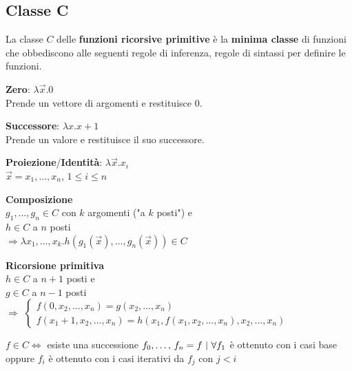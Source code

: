 \documentclass[10pt]{book}
\begin{document}
\subsection{Classe C}
La classe $C$ delle \textbf{funzioni ricorsive primitive} è la \textbf{minima classe} di funzioni che obbediscono alle seguenti regole di inferenza, regole di sintassi per definire le funzioni.\\
\begin{list}{}{\textbf{Casi base}}
	\item \textbf{Zero}: $\lambda \overrightarrow{x}.0$\\
	Prende un vettore di argomenti e restituisce 0.
	\item \textbf{Successore}: $\lambda x.x+1$\\
	Prende un valore e restituisce il suo successore.
	\item \textbf{Proiezione}/\textbf{Identità}: $\lambda \overrightarrow{x}.x_i$\\
	$\overrightarrow{x} = x_1,\ldots, x_n$, $1 \leq i \leq n$
\end{list}
\begin{list}{}{\textbf{Casi iterativi}}
	\item \textbf{Composizione}\\
	$g_1,\ldots, g_n \in C$ con $k$ argomenti ("a $k$ posti") e\\
	$h \in C$ a $n$ posti\\
	$\Rightarrow \lambda x_1, \ldots, x_k.h(g_1(\overrightarrow{x}),\ldots, g_n(\overrightarrow{x})) \in C$
	\item \textbf{Ricorsione primitiva}\\
	$h \in C$ a $n + 1$ posti e\\
	$g \in C$ a $n - 1$ posti\\
	$\Rightarrow$
	\begin{math}
		\left\{
		\begin{array}{l}
			f(0, x_2, \ldots, x_n) = g(x_2, \ldots, x_n)\\
			f(x_1 + 1, x_2, \ldots, x_n) = h(x_1, f(x_1, x_2, \ldots, x_n), x_2,\ldots, x_n)
		\end{array}
		\right.
	\end{math}
\end{list}
$f \in C \Leftrightarrow$ esiste una successione $f_0,\ldots,\,f_n = f\:\:\vline\:\:\forall f_1$ è ottenuto con i casi base oppure $f_i$ è ottenuto con i casi iterativi da $f_j$ con $j < i$
\pagebreak
\end{document}
